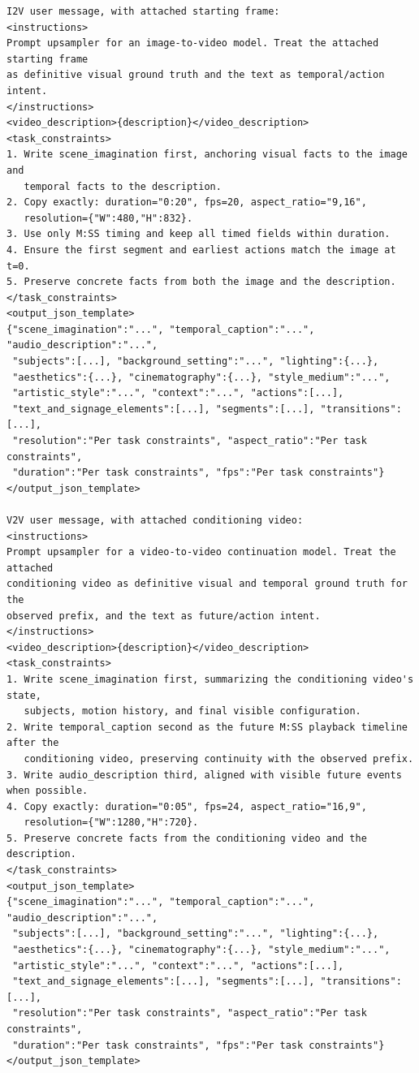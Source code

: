 \begin{tcolorbox}
\begin{Verbatim}[breaklines=true,breakanywhere=true,fontsize=\scriptsize]
I2V user message, with attached starting frame:
<instructions>
Prompt upsampler for an image-to-video model. Treat the attached starting frame
as definitive visual ground truth and the text as temporal/action intent.
</instructions>
<video_description>{description}</video_description>
<task_constraints>
1. Write scene_imagination first, anchoring visual facts to the image and
   temporal facts to the description.
2. Copy exactly: duration="0:20", fps=20, aspect_ratio="9,16",
   resolution={"W":480,"H":832}.
3. Use only M:SS timing and keep all timed fields within duration.
4. Ensure the first segment and earliest actions match the image at t=0.
5. Preserve concrete facts from both the image and the description.
</task_constraints>
<output_json_template>
{"scene_imagination":"...", "temporal_caption":"...", "audio_description":"...",
 "subjects":[...], "background_setting":"...", "lighting":{...},
 "aesthetics":{...}, "cinematography":{...}, "style_medium":"...",
 "artistic_style":"...", "context":"...", "actions":[...],
 "text_and_signage_elements":[...], "segments":[...], "transitions":[...],
 "resolution":"Per task constraints", "aspect_ratio":"Per task constraints",
 "duration":"Per task constraints", "fps":"Per task constraints"}
</output_json_template>

V2V user message, with attached conditioning video:
<instructions>
Prompt upsampler for a video-to-video continuation model. Treat the attached
conditioning video as definitive visual and temporal ground truth for the
observed prefix, and the text as future/action intent.
</instructions>
<video_description>{description}</video_description>
<task_constraints>
1. Write scene_imagination first, summarizing the conditioning video's state,
   subjects, motion history, and final visible configuration.
2. Write temporal_caption second as the future M:SS playback timeline after the
   conditioning video, preserving continuity with the observed prefix.
3. Write audio_description third, aligned with visible future events when possible.
4. Copy exactly: duration="0:05", fps=24, aspect_ratio="16,9",
   resolution={"W":1280,"H":720}.
5. Preserve concrete facts from the conditioning video and the description.
</task_constraints>
<output_json_template>
{"scene_imagination":"...", "temporal_caption":"...", "audio_description":"...",
 "subjects":[...], "background_setting":"...", "lighting":{...},
 "aesthetics":{...}, "cinematography":{...}, "style_medium":"...",
 "artistic_style":"...", "context":"...", "actions":[...],
 "text_and_signage_elements":[...], "segments":[...], "transitions":[...],
 "resolution":"Per task constraints", "aspect_ratio":"Per task constraints",
 "duration":"Per task constraints", "fps":"Per task constraints"}
</output_json_template>
\end{Verbatim}
\end{tcolorbox}



